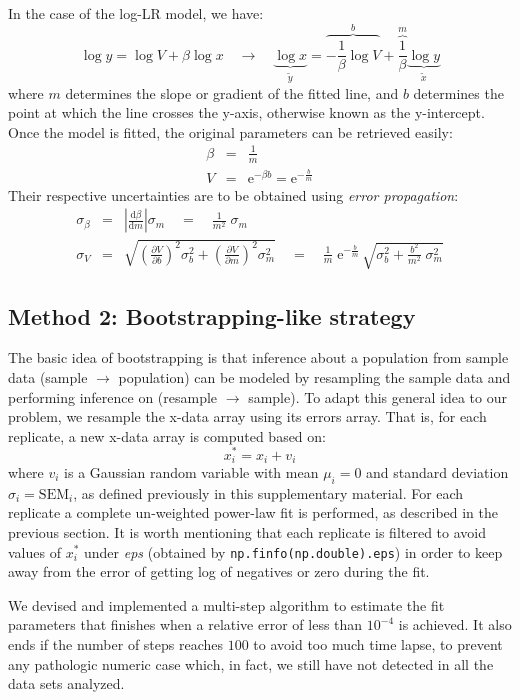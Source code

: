 \documentclass[12pt]{article}
\begin{document}
In the case of the log-LR model, we have:
$$\log y = \log V + \beta\log x \quad\rightarrow\quad \underbrace{\log x}_{\tilde y} = \overbrace{-\frac{1}{\beta}\log V}^{b} + \overbrace{\frac{1}{\beta}}^{m}\underbrace{\log y}_{\tilde x}$$ 
where $m$ determines the slope or gradient of the fitted line, and $b$ determines the point at which the line crosses the y-axis, otherwise known as the y-intercept. Once the model is fitted, the original parameters can be retrieved easily:
\begin{eqnarray*}
\beta &=& \frac{1}{m} \\
V &=& \mathrm{e}^{-\beta b} = \mathrm{e}^{-\frac{b}{m}}
\end{eqnarray*}
Their respective uncertainties are to be obtained using \emph{error propagation}:
\begin{eqnarray*}
    \sigma_\beta &=& \left|\frac{\mathrm{d}\beta}{\mathrm{d}m}\right|\sigma_m \quad=\quad \frac{1}{m^2}\;\sigma_m \\
    \sigma_V &=& \sqrt{\left(\frac{\partial V}{\partial b}\right)^{\!\!2}\sigma_b^2 +
      \left(\frac{\partial V}{\partial m}\right)^{\!\!2}\sigma_m^2} \quad=\quad
      \frac{1}{m}\;\mathrm{e}^{-\frac{b}{m}}\,\sqrt{\sigma_b^2 + \frac{b^2}{m^2}\;\sigma_m^2} 
\end{eqnarray*}

\subsection{Method 2: Bootstrapping-like strategy}

The basic idea of bootstrapping is that inference about a population from sample data (sample $\rightarrow$ population) can be modeled by resampling the sample data and performing inference on (resample $\rightarrow$ sample). To adapt this general idea to our problem, we resample the x-data array using its errors array. That is, for each replicate, a new x-data array is computed based on:
$$x^*_i = x_i + v_i$$
where $v_i$ is a Gaussian random variable with mean $\mu_i=0$ and standard deviation $\sigma_i=\mathrm{SEM}_i$, as defined previously in this supplementary material. For each replicate a complete un-weighted power-law fit is performed, as described in the previous section. It is worth mentioning that each replicate is filtered to avoid values of $x^*_i$ under \emph{eps} (obtained by \texttt{np.finfo(np.double).eps}) in order to keep away from the error of getting log of negatives or zero during the fit.

We devised and implemented a multi-step algorithm to estimate the fit parameters that finishes when a relative error of less than $10^{-4}$ is achieved. It also ends if the number of steps reaches $100$ to avoid too much time lapse, to prevent any pathologic numeric case which, in fact, we still have not detected in all the data sets analyzed.
\end{document}
